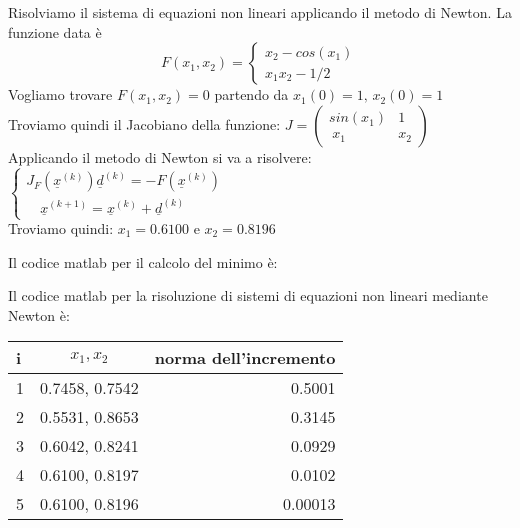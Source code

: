 Risolviamo il sistema di equazioni non lineari applicando il metodo di Newton.
La funzione data è \[F(x_1, x_2)= \begin{cases}x_2-cos(x_1)\\ x_1x_2 -1/2\end{cases}\]
Vogliamo trovare $F(x_1, x_2)=0$ partendo da $x_1(0) = 1\mbox{, } x_2(0) = 1$\\
Troviamo quindi il Jacobiano della funzione: \( J=\begin{pmatrix} sin(x_1) & 1  \\\ x_1 & x_2 \end{pmatrix} \)\\
Applicando il metodo di Newton si va a risolvere:
$\begin{cases} J_F(\underline{x}^{(k)})\underline{d}^{(k)}=-F(\underline{x}^{(k)}) \\ \quad \underline{x}^{(k+1)}=\underline{x}^{(k)}+\underline{d}^{(k)} \end{cases}$\\
Troviamo quindi: $x_1 = 0.6100 \mbox{ e } x_2 =0.8196$

Il codice matlab per il calcolo del minimo è:


Il codice matlab per la risoluzione di sistemi di equazioni non lineari mediante Newton è:


\begin{tabular}{l|c|r}
i & $x_1,x_2$ & norma dell'incremento \\
\hline
1 & 0.7458, 0.7542 & 0.5001 \\
2 & 0.5531, 0.8653 & 0.3145 \\
3 & 0.6042, 0.8241 & 0.0929 \\
4 & 0.6100, 0.8197 & 0.0102 \\
5 & 0.6100, 0.8196 & 0.00013 \\ 


\end{tabular}
